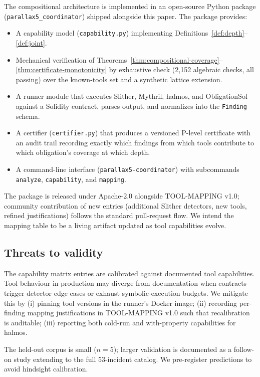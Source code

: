 \documentclass[11pt,a4paper]{article}
\begin{document}
The compositional architecture is implemented in an open-source Python package (\texttt{parallax5\_coordinator}) shipped alongside this paper. The package provides:
\begin{itemize}
\item A capability model (\texttt{capability.py}) implementing Definitions~\ref{def:depth}--\ref{def:joint}.
\item Mechanical verification of Theorems~\ref{thm:compositional-coverage}--\ref{thm:certificate-monotonicity} by exhaustive check (2{,}152 algebraic checks, all passing) over the known-tools set and a synthetic lattice extension.
\item A runner module that executes Slither, Mythril, halmos, and ObligationSol against a Solidity contract, parses output, and normalizes into the \texttt{Finding} schema.
\item A certifier (\texttt{certifier.py}) that produces a versioned P-level certificate with an audit trail recording exactly which findings from which tools contribute to which obligation's coverage at which depth.
\item A command-line interface (\texttt{parallax5-coordinator}) with subcommands \texttt{analyze}, \texttt{capability}, and \texttt{mapping}.
\end{itemize}

The package is released under Apache-2.0 alongside TOOL-MAPPING v1.0; community contribution of new entries (additional Slither detectors, new tools, refined justifications) follows the standard pull-request flow. We intend the mapping table to be a living artifact updated as tool capabilities evolve.

\subsection{Threats to validity}

The capability matrix entries are calibrated against documented tool capabilities. Tool behaviour in production may diverge from documentation when contracts trigger detector edge cases or exhaust symbolic-execution budgets. We mitigate this by (i) pinning tool versions in the runner's Docker image; (ii) recording per-finding mapping justifications in TOOL-MAPPING v1.0 such that recalibration is auditable; (iii) reporting both cold-run and with-property capabilities for halmos.

The held-out corpus is small ($n = 5$); larger validation is documented as a follow-on study extending to the full 53-incident catalog. We pre-register predictions to avoid hindsight calibration.
\end{document}
